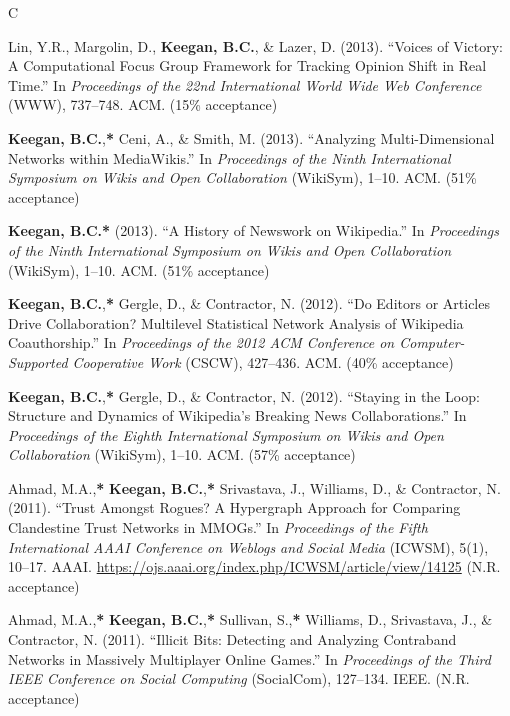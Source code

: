 \documentclass{cv}
\begin{document}
\begin{entries}{C}
		\item Lin, Y.R., Margolin, D., \textbf{Keegan, B.C.}, \& Lazer, D. (2013). ``Voices of Victory: A Computational Focus Group Framework for Tracking Opinion Shift in Real Time.'' In \textit{Proceedings of the 22nd International World Wide Web Conference} (WWW), 737--748. ACM.  (15\% acceptance)
		\item \textbf{Keegan, B.C.},\textbf{*} Ceni, A., \& Smith, M. (2013). ``Analyzing Multi-Dimensional Networks within MediaWikis.'' In \textit{Proceedings of the Ninth International Symposium on Wikis and Open Collaboration} (WikiSym), 1--10. ACM.  (51\% acceptance)
		\item \textbf{Keegan, B.C.}\textbf{*} (2013). ``A History of Newswork on Wikipedia.'' In \textit{Proceedings of the Ninth International Symposium on Wikis and Open Collaboration} (WikiSym), 1--10. ACM.  (51\% acceptance)
		\item \textbf{Keegan, B.C.},\textbf{*} Gergle, D., \& Contractor, N. (2012). ``Do Editors or Articles Drive Collaboration? Multilevel Statistical Network Analysis of Wikipedia Coauthorship.'' In \textit{Proceedings of the 2012 ACM Conference on Computer-Supported Cooperative Work} (CSCW), 427--436. ACM.  (40\% acceptance)
		\item \textbf{Keegan, B.C.},\textbf{*} Gergle, D., \& Contractor, N. (2012). ``Staying in the Loop: Structure and Dynamics of Wikipedia's Breaking News Collaborations.'' In \textit{Proceedings of the Eighth International Symposium on Wikis and Open Collaboration} (WikiSym), 1--10. ACM.  (57\% acceptance)
		\item Ahmad, M.A.,\textbf{*} \textbf{Keegan, B.C.},\textbf{*} Srivastava, J., Williams, D., \& Contractor, N. (2011). ``Trust Amongst Rogues? A Hypergraph Approach for Comparing Clandestine Trust Networks in MMOGs.'' In \textit{Proceedings of the Fifth International AAAI Conference on Weblogs and Social Media} (ICWSM), 5(1), 10--17. AAAI. \url{https://ojs.aaai.org/index.php/ICWSM/article/view/14125} (N.R. acceptance)
		\item Ahmad, M.A.,\textbf{*} \textbf{Keegan, B.C.},\textbf{*} Sullivan, S.,\textbf{*} Williams, D., Srivastava, J., \& Contractor, N. (2011). ``Illicit Bits: Detecting and Analyzing Contraband Networks in Massively Multiplayer Online Games.'' In \textit{Proceedings of the Third IEEE Conference on Social Computing} (SocialCom), 127--134. IEEE.  (N.R. acceptance)

\end{entries}
\end{document}
